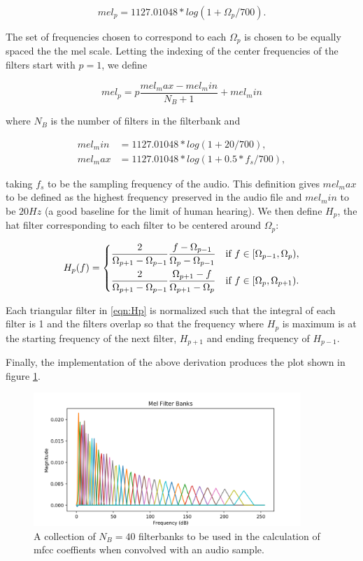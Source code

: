 \documentclass[11pt,a4paper]{article}
\begin{document}
\begin{equation}
mel_p = 1127.01048*log(1+\Omega_p/700).
\end{equation}

The set of frequencies chosen to correspond to each $\Omega_p$ is chosen to be equally spaced the the mel scale. Letting the indexing of the center frequencies of the filters start with $p=1$, we define

\begin{equation}
mel_p = p\frac{mel_max-mel_min}{N_B+1}+mel_min
\end{equation}

where $N_B$ is the number of filters in the filterbank and

\begin{align*}
mel_min &= 1127.01048*log(1+20/700), \\
mel_max &= 1127.01048*log(1+0.5*f_s/700),
\end{align*}

taking $f_s$ to be the sampling frequency of the audio. This definition gives $mel_max$ to be defined as the highest frequency preserved in the audio file and $mel_min$ to be $20Hz$ (a good baseline for the limit of human hearing).
We then define $H_p$, the hat filter corresponding to each filter to be centered around $\Omega_p$:

\begin{equation} \label{eqn:Hp}
H_p(f) = %
	\begin{dcases}
		\frac{2}{\Omega_{p+1}-\Omega_{p-1}}\frac{f-\Omega_{p-1}}{\Omega_p-\Omega_{p-1}} &\text{if $f \in [\Omega_{p-1},\Omega_p)$,} \\
		\frac{2}{\Omega_{p+1}-\Omega_{p-1}}\frac{\Omega_{p+1}-f}{\Omega_{p+1}-\Omega_{p}} &\text{if $f \in [\Omega_{p},\Omega_{p+1})$.}
	\end{dcases}
\end{equation}

Each triangular filter in \ref{eqn:Hp} is normalized such that the integral of each filter is 1 and the filters overlap so that the frequency where $H_p$ is maximum is at the starting frequency of the next filter, $H_{p+1}$ and ending frequency of $H_{p-1}$.

Finally, the implementation of the above derivation produces the plot shown in figure \ref{fig:mel}.

\begin{figure}
	\centering
	\includegraphics[width=0.9\textwidth]{melBanks}
	\caption{A collection of $N_B=40$ filterbanks to be used in the calculation of mfcc coeffients when convolved with an audio sample.}
	\label{fig:mel}
\end{figure}
\end{document}
